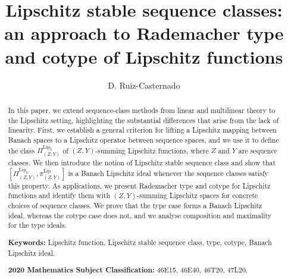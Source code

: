 \documentclass[12pt]{amsart}
\def\Lip{\mathrm{Lip}_0}
\def\Lipnorm{\mathrm{Lip}}
\begin{document}
\title[Lipschitz stable sequence classes]{Lipschitz stable sequence classes: an approach to Rademacher type and cotype of Lipschitz functions}


\author[D. Ruiz-Casternado]{D. Ruiz-Casternado}
\address[David Ruiz-Casternado]{Departamento de Matem{\'a}ticas, Universidad de Almer{\'i}a, Ctra. de Sacramento s/n, 04120 La Ca\~{n}ada de San Urbano, Almer\'ia, Spain.}

\begin{abstract}
    In this paper, we extend sequence-class methods from linear and multilinear theory to the Lipschitz setting, highlighting the substantial differences that arise from the lack of linearity. First, we establish a general criterion for lifting a Lipschitz mapping between Banach spaces to a Lipschitz operator between sequence spaces, and we use it to define the class $\Pi_{(Z,Y)}^{\Lip}$ of $(Z,Y)$-summing Lipschitz functions, where $Z$ and $Y$ are sequence classes. We then introduce the notion of Lipschitz stable sequence class and show that $[\Pi_{(Z,Y)}^{\Lip},\pi_{(Z,Y)}^{\Lipnorm}]$ is a Banach Lipschitz ideal whenever the sequence classes satisfy this property. As applications, we present Rademacher type and cotype for Lipschitz functions and identify them with $(Z,Y)$-summing Lipschitz spaces for concrete choices of sequence classes. We prove that the type case forms a Banach Lipschitz ideal, whereas the cotype case does not, and we analyse composition and maximality for the type ideals.

		\vspace{5pt}
		\textbf{Keywords:} Lipschitz function, Lipschitz stable sequence class, type, cotype, Banach Lipschitz ideal.

		
		\vspace{5pt}
		\noindent
		\textbf{2020 Mathematics Subject Classification:} 46E15, 46E40, 46T20, 47L20.
	\end{abstract}
	
\end{document}
